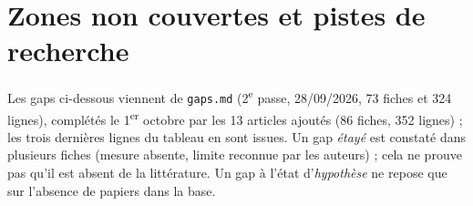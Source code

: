 \section{Zones non couvertes et pistes de recherche}
\label{sec:gaps}

Les gaps ci-dessous viennent de \texttt{gaps.md} (2\textsuperscript{e} passe, 28/09/2026,
73 fiches et 324 lignes), complétés le 1\textsuperscript{er} octobre par les 13 articles
ajoutés (86 fiches, 352 lignes) ; les trois dernières lignes du tableau en sont issues. Un gap \emph{étayé} est constaté dans plusieurs fiches (mesure
absente, limite reconnue par les auteurs) ; cela ne prouve pas qu'il est absent de la
littérature. Un gap à l'état d'\emph{hypothèse} ne repose que sur l'absence de papiers
dans la base.


